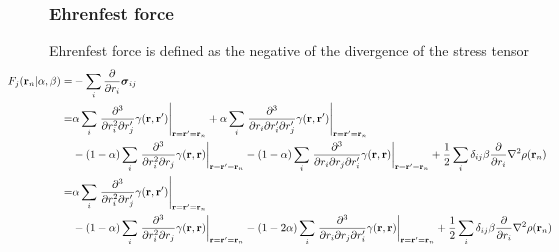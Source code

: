 \documentclass[letterpaper]{article}
\begin{document}
\subsubsection{Ehrenfest force}
Ehrenfest force is defined as the negative of the divergence of the stress tensor
\begin{equation}
  \hspace{-4em}
  \begin{split}
    F_{j}(\mathbf{r}_n | \alpha, \beta)
    =&
    - \sum_i \frac{\partial}{\partial r_i} \boldsymbol{\sigma}_{ij}\\
    =&
    \alpha
    \sum_i
    \left.
      \frac{\partial^3}{\partial r^2_i \partial r'_j} \gamma(\mathbf{r}, \mathbf{r}')
    \right|_{\mathbf{r} = \mathbf{r}' = \mathbf{r}_n}
    + \alpha
    \sum_i
    \left.
      \frac{\partial^3}{\partial r_i \partial r'_i \partial r'_j} \gamma(\mathbf{r}, \mathbf{r}')
    \right|_{\mathbf{r} = \mathbf{r}' = \mathbf{r}_n}\\
    &- (1 - \alpha)
    \sum_i
    \left.
      \frac{\partial^3}{\partial r^2_i \partial r_j} \gamma(\mathbf{r}, \mathbf{r})
    \right|_{\mathbf{r} = \mathbf{r}' = \mathbf{r}_n}
    - (1 - \alpha)
    \sum_i
    \left.
      \frac{\partial^3}{\partial r_i \partial r_j \partial r'_i} \gamma(\mathbf{r}, \mathbf{r})
    \right|_{\mathbf{r} = \mathbf{r}' = \mathbf{r}_n}
    + \frac{1}{2} \sum_i \delta_{ij} \beta
    \frac{\partial}{\partial r_i} \nabla^2 \rho(\mathbf{r}_n)\\
    =&
    \alpha
    \sum_i
    \left.
      \frac{\partial^3}{\partial r^2_i \partial r'_j} \gamma(\mathbf{r}, \mathbf{r}')
    \right|_{\mathbf{r} = \mathbf{r}' = \mathbf{r}_n}\\
    &- (1 - \alpha)
    \sum_i
    \left.
      \frac{\partial^3}{\partial r^2_i \partial r_j} \gamma(\mathbf{r}, \mathbf{r})
    \right|_{\mathbf{r} = \mathbf{r}' = \mathbf{r}_n}
    - (1 - 2\alpha)
    \sum_i
    \left.
      \frac{\partial^3}{\partial r_i \partial r_j \partial r'_i} \gamma(\mathbf{r}, \mathbf{r})
    \right|_{\mathbf{r} = \mathbf{r}' = \mathbf{r}_n}
    + \frac{1}{2} \sum_i \delta_{ij} \beta
    \frac{\partial}{\partial r_i} \nabla^2 \rho(\mathbf{r}_n)\\
  \end{split}
\end{equation}
\end{document}
